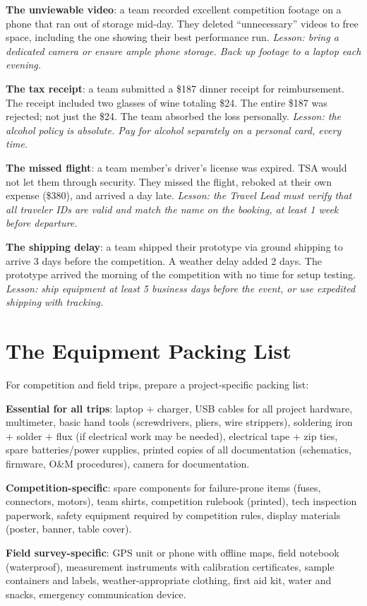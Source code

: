 \textbf{The unviewable video}: a team recorded excellent competition footage on a phone that ran out of storage mid-day. They deleted ``unnecessary'' videos to free space, including the one showing their best performance run. \emph{Lesson: bring a dedicated camera or ensure ample phone storage. Back up footage to a laptop each evening.}

\textbf{The tax receipt}: a team submitted a \$187 dinner receipt for reimbursement. The receipt included two glasses of wine totaling \$24. The entire \$187 was rejected; not just the \$24. The team absorbed the loss personally. \emph{Lesson: the alcohol policy is absolute. Pay for alcohol separately on a personal card, every time.}

\textbf{The missed flight}: a team member's driver's license was expired. TSA would not let them through security. They missed the flight, reboked at their own expense (\$380), and arrived a day late. \emph{Lesson: the Travel Lead must verify that all traveler IDs are valid and match the name on the booking, at least 1 week before departure.}

\textbf{The shipping delay}: a team shipped their prototype via ground shipping to arrive 3 days before the competition. A weather delay added 2 days. The prototype arrived the morning of the competition with no time for setup testing. \emph{Lesson: ship equipment at least 5 business days before the event, or use expedited shipping with tracking.}

\section{The Equipment Packing List}
For competition and field trips, prepare a project-specific packing list:

\textbf{Essential for all trips}: laptop + charger, USB cables for all project hardware, multimeter, basic hand tools (screwdrivers, pliers, wire strippers), soldering iron + solder + flux (if electrical work may be needed), electrical tape + zip ties, spare batteries/power supplies, printed copies of all documentation (schematics, firmware, O\&M procedures), camera for documentation.

\textbf{Competition-specific}: spare components for failure-prone items (fuses, connectors, motors), team shirts, competition rulebook (printed), tech inspection paperwork, safety equipment required by competition rules, display materials (poster, banner, table cover).

\textbf{Field survey-specific}: GPS unit or phone with offline maps, field notebook (waterproof), measurement instruments with calibration certificates, sample containers and labels, weather-appropriate clothing, first aid kit, water and snacks, emergency communication device.



